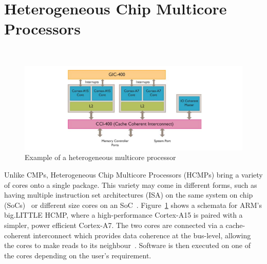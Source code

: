 \section{Heterogeneous Chip Multicore Processors}~\label{sec:hcmp}

\begin{figure}[t]
 \center
 \includegraphics[width=1\textwidth]{background/graphics/biglittle.png}
 	\vspace{-3em}

 \caption{Example of a heterogeneous multicore processor~\cite{armbig}}\label{fig:blarm}
\end{figure}
\vspace{-1em}

Unlike CMPs, Heterogeneous Chip Multicore Processors (HCMPs) bring a variety of cores onto a single package.
This variety may come in different forms, such as having multiple instruction set architectures (ISA) on the same system on chip (SoCs)~\cite{venkat2014harnessingisa,venkatHipstr2016} or different size cores on an SoC~\cite{armbig,jeff2012big}.
Figure~\ref{fig:blarm} shows a schemata for ARM's big.LITTLE HCMP, where a high-performance Cortex-A15 is paired with a simpler, power efficient Cortex-A7.
The two cores are connected via a cache-coherent interconnect which provides data coherence at the bus-level, allowing the cores to make reads to its neighbour~\cite{armbig}.
Software is then executed on one of the cores depending on the user's requirement.

